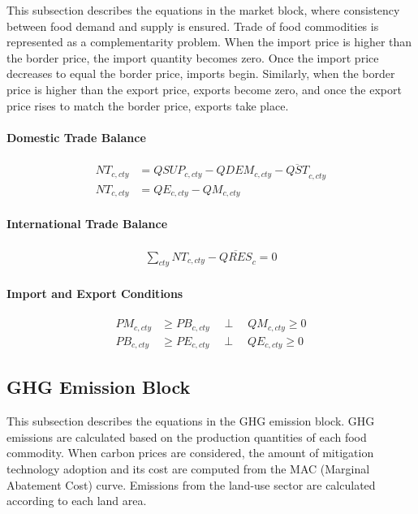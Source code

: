 This subsection describes the equations in the market block, where consistency between food demand and supply is ensured.  
Trade of food commodities is represented as a complementarity problem.  
When the import price is higher than the border price, the import quantity becomes zero.  
Once the import price decreases to equal the border price, imports begin.  
Similarly, when the border price is higher than the export price, exports become zero, and once the export price rises to match the border price, exports take place.

\paragraph{Domestic Trade Balance}
\begin{align}
  NT_{c,cty}
  &= QSUP_{c,cty} - QDEM_{c,cty} - \overline{QST}_{c,cty}
  \tag{NTEQ}\label{eq:NTEQ}\\[0.6em]
  NT_{c,cty}
  &= QE_{c,cty} - QM_{c,cty}
  \tag{QEQMEQ}\label{eq:QEQMEQ}
\end{align}

\paragraph{International Trade Balance}
\begin{align}
  \sum_{cty} NT_{c,cty} - \overline{QRES}_{c} = 0
  \tag{NT0EQ}\label{eq:NT0EQ}
\end{align}

\paragraph{Import and Export Conditions}
\begin{align}
  PM_{c,cty} &\ge PB_{c,cty}
  \quad \perp \quad
  QM_{c,cty} \ge 0
  \tag{PBPMEQ}\label{eq:PBPMEQ}\\[0.4em]
  PB_{c,cty} &\ge PE_{c,cty}
  \quad \perp \quad
  QE_{c,cty} \ge 0
  \tag{PBPEEQ}\label{eq:PBPEEQ}
\end{align}



\subsection{GHG Emission Block}

This subsection describes the equations in the GHG emission block.  
GHG emissions are calculated based on the production quantities of each food commodity.  
When carbon prices are considered, the amount of mitigation technology adoption and its cost are computed from the MAC (Marginal Abatement Cost) curve.  
Emissions from the land-use sector are calculated according to each land area.


